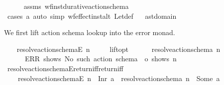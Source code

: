 \begin{isabellebody}
%
\isadelimproof
\ \ \ \ %
\endisadelimproof
%
\isatagproof
{}\isamarkupfalse%
\ assms\ wf{\isacharunderscore}{\kern0pt}inst{\isacharunderscore}{\kern0pt}durative{\isacharunderscore}{\kern0pt}action{\isacharunderscore}{\kern0pt}schema\isanewline
\ \ \ \ \isamarkupfalse%
\ {\isacharparenleft}{\kern0pt}cases\ a{\isacharparenright}{\kern0pt}\ {\isacharparenleft}{\kern0pt}auto\ simp{\isacharcolon}{\kern0pt}\ wf{\isacharunderscore}{\kern0pt}effect{\isacharunderscore}{\kern0pt}inst{\isacharunderscore}{\kern0pt}alt\ Let{\isacharunderscore}{\kern0pt}def{\isacharparenright}{\kern0pt}%
\endisatagproof
{\isafoldproof}%
%
\isadelimproof
\isanewline
%
\endisadelimproof
\isanewline
{}\isamarkupfalse%
\ %
%
\isadelimdocument
%
\endisadelimdocument
%
\isatagdocument
%
\isamarkuptrue%
%
\endisatagdocument
{\isafolddocument}%
%
\isadelimdocument
%
\endisadelimdocument
{}\isamarkupfalse%
\ ast{\isacharunderscore}{\kern0pt}domain\ %
\begin{isamarkuptext}%
We first lift action schema lookup into the error monad.%
\end{isamarkuptext}\isamarkuptrue%
\ \ \isamarkupfalse%
\ {\isachardoublequoteopen}resolve{\isacharunderscore}{\kern0pt}action{\isacharunderscore}{\kern0pt}schemaE\ n\ {\isasymequiv}\isanewline
\ \ \ \ lift{\isacharunderscore}{\kern0pt}opt\isanewline
\ \ \ \ \ \ {\isacharparenleft}{\kern0pt}resolve{\isacharunderscore}{\kern0pt}action{\isacharunderscore}{\kern0pt}schema\ n{\isacharparenright}{\kern0pt}\isanewline
\ \ \ \ \ \ {\isacharparenleft}{\kern0pt}ERR\ {\isacharparenleft}{\kern0pt}shows\ {\isacharprime}{\kern0pt}{\isacharprime}{\kern0pt}No\ such\ action\ schema\ {\isacharprime}{\kern0pt}{\isacharprime}{\kern0pt}\ o\ shows\ n{\isacharparenright}{\kern0pt}{\isacharparenright}{\kern0pt}{\isachardoublequoteclose}\isanewline
\isanewline
\ \ \isamarkupfalse%
\ resolve{\isacharunderscore}{\kern0pt}action{\isacharunderscore}{\kern0pt}schemaE{\isacharunderscore}{\kern0pt}return{\isacharunderscore}{\kern0pt}iff{\isacharbrackleft}{\kern0pt}return{\isacharunderscore}{\kern0pt}iff{\isacharbrackright}{\kern0pt}{\isacharcolon}{\kern0pt}\ \isanewline
\ \ \ \ {\isachardoublequoteopen}{\isacharparenleft}{\kern0pt}resolve{\isacharunderscore}{\kern0pt}action{\isacharunderscore}{\kern0pt}schemaE\ n\ {\isacharequal}{\kern0pt}\ Inr\ a{\isacharparenright}{\kern0pt}\ {\isasymlongleftrightarrow}\ {\isacharparenleft}{\kern0pt}resolve{\isacharunderscore}{\kern0pt}action{\isacharunderscore}{\kern0pt}schema\ n\ {\isacharequal}{\kern0pt}\ Some\ a{\isacharparenright}{\kern0pt}{\isachardoublequoteclose}\isanewline

\end{isabellebody}
